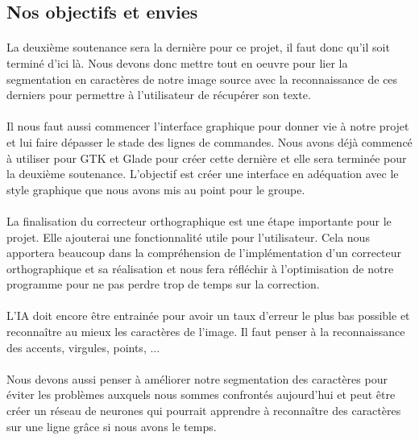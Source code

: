 \documentclass{article}
\begin{document}
\vspace*{1cm}

\subsection{Nos objectifs et envies}

\paragraph{}La deuxième soutenance sera la dernière pour ce projet, il faut donc qu'il soit terminé d'ici là. Nous devons donc mettre tout en oeuvre pour lier la segmentation en caractères de notre image source avec la reconnaissance de ces derniers pour permettre à l'utilisateur de récupérer son texte.

\paragraph{}Il nous faut aussi commencer l'interface graphique pour donner vie à notre projet et lui faire dépasser le stade des lignes de commandes. Nous avons déjà commencé à utiliser pour GTK et Glade pour créer cette dernière et elle sera terminée pour la deuxième soutenance. L'objectif est créer une interface en adéquation avec le style graphique que nous avons mis au point pour le groupe.

\paragraph{}La finalisation du correcteur orthographique est une étape importante pour le projet. Elle ajouterai une fonctionnalité utile pour l'utilisateur. Cela nous apportera beaucoup dans la compréhension de l'implémentation d'un correcteur orthographique et sa réalisation et nous fera réfléchir à l'optimisation de notre programme pour ne pas perdre trop de temps sur la correction. 

\paragraph{}L'IA doit encore être entrainée pour avoir un taux d'erreur le plus bas possible et reconnaître au mieux les caractères de l'image. Il faut penser à la reconnaissance des accents, virgules, points, ...

\paragraph{}Nous devons aussi penser à améliorer notre segmentation des caractères pour éviter les problèmes auxquels nous sommes confrontés aujourd'hui et peut être créer un réseau de neurones qui pourrait apprendre à reconnaître des caractères sur une ligne grâce si nous avons le temps.
\end{document}
